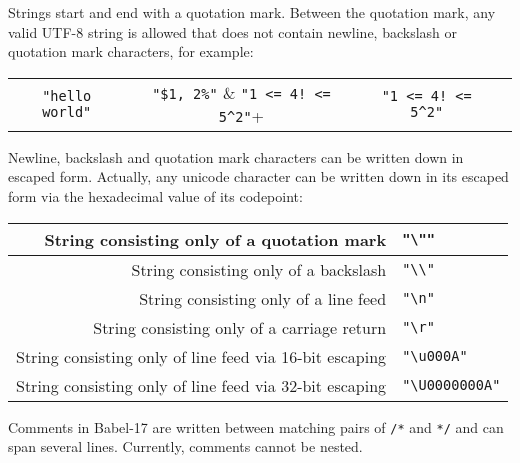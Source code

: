 \documentclass[11pt]{amsart}
\begin{document}
Strings start and end with a quotation mark. Between the quotation mark, any valid UTF-8 string is allowed that does not contain newline, backslash or quotation mark characters, for example:
\begin{center}
\begin{tabular}{cccc}
\verb+"hello world"+ & \verb+"$1, 2%"+ & \verb+"1 <= 4! <= 5^2"+
\end{tabular}
\end{center}
Newline, backslash and quotation mark characters can be written down in escaped form. Actually, any unicode character can be written down in its escaped form via the hexadecimal value of its codepoint: 
\begin{center}
\begin{tabular}{r|l}
String consisting only of a quotation mark & \verb+"\""+\\\hline
String consisting only of a backslash & \verb+"\\"+ \\\hline
String consisting only of a line feed & \verb+"\n"+ \\\hline
String consisting only of a carriage return & \verb+"\r"+ \\\hline
String consisting only of line feed via 16-bit escaping & \verb+"\u000A"+ \\\hline
String consisting only of line feed via 32-bit escaping & \verb+"\U0000000A"+
\end{tabular}
\end{center}

Comments in Babel-17 are written between matching pairs of \verb+/*+ and \verb+*/+ and can span several lines. Currently, comments cannot be nested.
\end{document}
